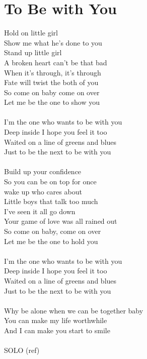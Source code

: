 \section{To Be with You}
\begin{multicols}{2}
Hold on little girl\\
Show me what he's done to you\\
Stand up little girl\\
A broken heart can't be that bad\\
When it's through, it's through\\
Fate will twist the both of you\\
So come on baby come on over\\
Let me be the one to show you\\
\\
I'm the one who wants to be with you\\
Deep inside I hope you feel it too\\
Waited on a line of greens and blues\\
Just to be the next to be with you\\
\\
Build up your confidence\\
So you can be on top for once\\
wake up who cares about\\
Little boys that talk too much\\
I've seen it all go down\\
Your game of love was all rained out\\
So come on baby, come on over\\
Let me be the one to hold you\\
\\
I'm the one who wants to be with you\\
Deep inside I hope you feel it too\\
Waited on a line of greens and blues\\
Just to be the next to be with you\\
\\
Why be alone when we can be together baby\\
You can make my life worthwhile\\
And I can make you start to smile\\
\\
SOLO (ref)\\

\end{multicols}
